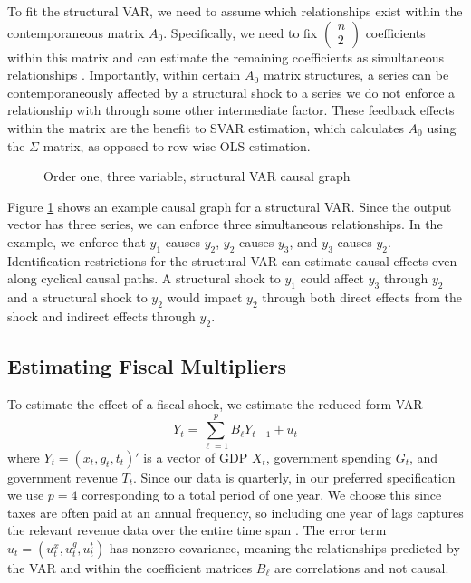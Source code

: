 To fit the structural VAR, we need to assume which relationships exist within the contemporaneous matrix $A_0$. Specifically, we need to fix $\begin{pmatrix} n \\ 2 \end{pmatrix}$ coefficients within this matrix and can estimate the remaining coefficients as simultaneous relationships \parencite{neusser2016time}. Importantly, within certain $A_0$ matrix structures, a series can be contemporaneously affected by a structural shock to a series we do not enforce a relationship with through some other intermediate factor. These feedback effects within the matrix are the benefit to SVAR estimation, which calculates $A_0$ using the $\Sigma$ matrix, as opposed to row-wise OLS estimation.

\begin{figure}[t!]
    \centering
    \caption{Order one, three variable, structural VAR causal graph}
    
    \label{fig:svar-graph}
\end{figure}

Figure \ref{fig:svar-graph} shows an example causal graph for a structural VAR. Since the output vector has three series, we can enforce three simultaneous relationships. In the example, we enforce that $y_1$ causes $y_2$, $y_2$ causes $y_3$, and $y_3$ causes $y_2$. Identification restrictions for the structural VAR can estimate causal effects even along cyclical causal paths. A structural shock to $y_1$ could affect $y_3$ through $y_2$ and a structural shock to $y_2$ would impact $y_2$ through both direct effects from the shock and indirect effects through $y_2$.


\subsection{Estimating Fiscal Multipliers}

To estimate the effect of a fiscal shock, we estimate the reduced form VAR
\[
    Y_t = \sum_{\ell = 1}^p B_\ell Y_{t - 1} + u_t
\]
where $Y_t = (x_t, g_t, t_t)'$ is a vector of GDP $X_t$, government spending $G_t$, and government revenue $T_t$. Since our data is quarterly, in our preferred specification we use $p = 4$ corresponding to a total period of one year. We choose this since taxes are often paid at an annual frequency, so including one year of lags captures the relevant revenue data over the entire time span \parencite{blanchard2002empirical}. The error term $u_t = (u_t^x, u_t^g, u_t^t)$ has nonzero covariance, meaning the relationships predicted by the VAR and within the coefficient matrices $B_\ell$ are correlations and not causal.

